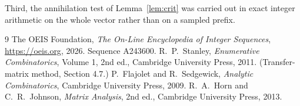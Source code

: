 \documentclass[11pt,a4paper]{article}
\theoremstyle{plain}
\theoremstyle{definition}
\begin{document}
Third, the annihilation test of Lemma~\ref{lem:crit} was carried out in exact integer
arithmetic on the whole vector rather than on a sampled prefix.

\begin{thebibliography}{9}
 The OEIS Foundation, \emph{The On-Line Encyclopedia of Integer
Sequences}, \url{https://oeis.org}, 2026. Sequence A243600.
 R.~P.~Stanley, \emph{Enumerative Combinatorics}, Volume 1, 2nd ed.,
Cambridge University Press, 2011. (Transfer-matrix method, Section 4.7.)
 P.~Flajolet and R.~Sedgewick, \emph{Analytic Combinatorics}, Cambridge
University Press, 2009.
 R.~A.~Horn and C.~R.~Johnson, \emph{Matrix Analysis}, 2nd ed., Cambridge
University Press, 2013.
\end{thebibliography}
\end{document}
